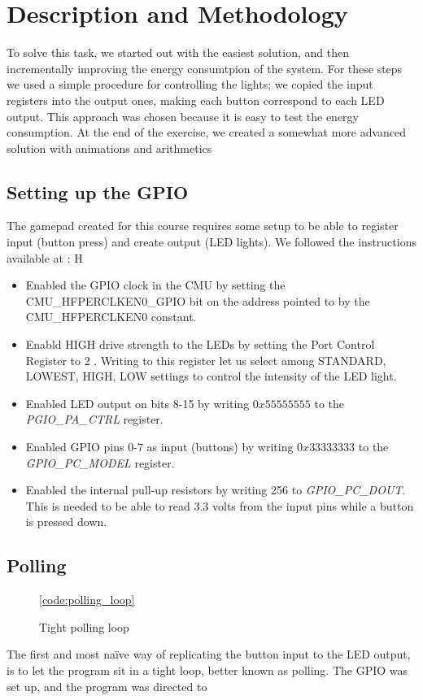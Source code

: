 \section{Description and Methodology}
\label{section:description_and_methodology}
To solve this task, we started out with the easiest solution, and then incrementally improving the energy consumtpion of the system. For these steps we used a simple procedure for controlling the lights; we copied the input registers into the output ones, making each button correspond to each LED output. This approach was chosen because it is easy to test the energy consumption. At the end of the exercise, we created a somewhat more advanced solution with animations and arithmetics

	\subsection{Setting up the GPIO}
	\label{subsection:gpio_setup}
	The gamepad created for this course requires some setup to be able to register input (button press) and create output (LED lights). We followed the instructions available at \cite[p. 24]{compendium}:
H
	\begin{itemize}
		\item Enabled the GPIO clock in the CMU by setting the CMU\_HFPERCLKEN0\_GPIO bit on the address pointed to by the CMU\_HFPERCLKEN0 constant.
		\item Enabld HIGH drive strength to the LEDs by setting the Port Control Register to 2 \cite[p. 766]{reference_manual}. Writing to this register let us select among STANDARD, LOWEST, HIGH, LOW settings to control the intensity of the LED light.
		\item Enabled LED output on bits 8-15 by writing $0x55555555$ to the \emph{PGIO\_PA\_CTRL} register.
		\item Enabled GPIO pins 0-7 as input (buttons) by writing $0x33333333$ to the \emph{GPIO\_PC\_MODEL} register.
		\item Enabled the internal pull-up resistors by writing 256 to \emph{GPIO\_PC\_DOUT}. This is needed to be able to read 3.3 volts from the input pins while a button is pressed down.
	\end{itemize}

	\subsection{Polling}
	\begin{figure}[h]
		\ref{code:polling_loop}
		
		\caption{Tight polling loop}
	\end{figure}
	The first and most naïve way of replicating the button input to the LED output, is to let the program sit in a tight loop, better known as polling. The GPIO was set up, and the program was directed to 

